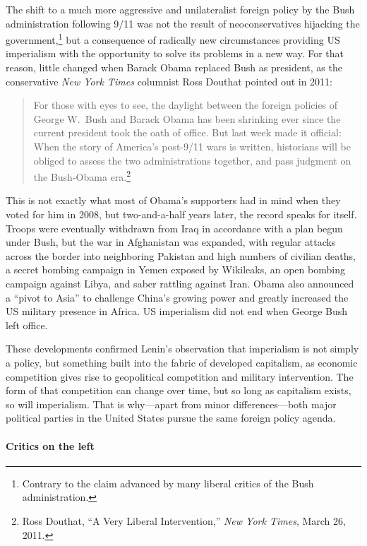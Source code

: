 The shift to a much more aggressive and unilateralist foreign policy by the Bush administration following 9/11 was not the result of neoconservatives hijacking the government,\footnote{Contrary to the claim advanced by many liberal critics of the Bush administration.} but a consequence of radically new circumstances providing US imperialism with the opportunity to solve its problems in a new way. For that reason, little changed when Barack Obama replaced Bush as president, as the conservative \emph{New York Times} columnist Ross Douthat pointed out in 2011:

\blockquote{For those with eyes to see, the daylight between the foreign policies of George W.\ Bush and Barack Obama has been shrinking ever since the current president took the oath of office. But last week made it official: When the story of America's post-9/11 wars is written, historians will be obliged to assess the two administrations together, and pass judgment on the Bush-Obama era.\footnote{Ross Douthat, ``A Very Liberal Intervention,'' \emph{New York Times}, March 26, 2011.}}

This is not exactly what most of Obama's supporters had in mind when they voted for him in 2008, but two-and-a-half years later, the record speaks for itself. Troops were eventually withdrawn from Iraq in accordance with a plan begun under Bush, but the war in Afghanistan was expanded, with regular attacks across the border into neighboring Pakistan and high numbers of civilian deaths, a secret bombing campaign in Yemen exposed by Wikileaks, an open bombing campaign against Libya, and saber rattling against Iran. Obama also announced a ``pivot to Asia'' to challenge China's growing power and greatly increased the US military presence in Africa. US imperialism did not end when George Bush left office.

These developments confirmed Lenin's observation that imperialism is not simply a policy, but something built into the fabric of developed capitalism, as economic competition gives rise to geopolitical competition and military intervention. The form of that competition can change over time, but so long as capitalism exists, so will imperialism. That is why---apart from minor differences---both major political parties in the United States pursue the same foreign policy agenda.

\paragraph{Critics on the left}

